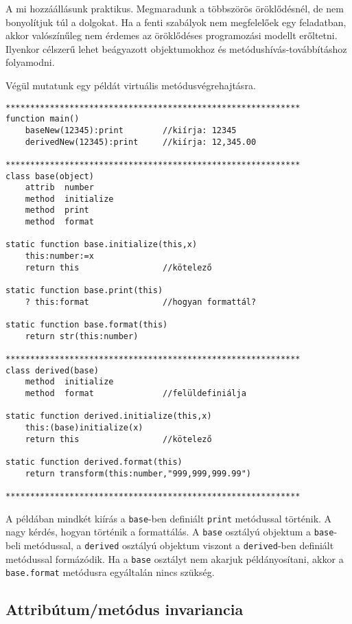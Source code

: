 A mi hozzáállásunk praktikus. Megmaradunk a többszörös öröklődésnél,
de nem bonyolítjuk túl a dolgokat. Ha a fenti szabályok nem megfelelőek
egy feladatban, akkor valószínűleg nem érdemes az öröklődéses
programozási modellt erőltetni. Ilyenkor célszerű lehet
beágyazott objektumokhoz és metódushívás-továbbításhoz folyamodni.

Végül mutatunk egy példát virtuális metódusvégrehajtásra.

\begin{verbatim}
************************************************************
function main()
    baseNew(12345):print        //kiírja: 12345
    derivedNew(12345):print     //kiírja: 12,345.00

************************************************************
class base(object)
    attrib  number
    method  initialize
    method  print
    method  format

static function base.initialize(this,x)
    this:number:=x
    return this                 //kötelező

static function base.print(this)
    ? this:format               //hogyan formattál?

static function base.format(this)
    return str(this:number)

************************************************************
class derived(base)
    method  initialize
    method  format              //felüldefiniálja

static function derived.initialize(this,x)
    this:(base)initialize(x)
    return this                 //kötelező

static function derived.format(this)
    return transform(this:number,"999,999,999.99")

************************************************************
\end{verbatim}
A példában mindkét kiírás a \verb!base!-ben definiált \verb!print!
metódussal történik. A nagy kérdés, hogyan történik a formattálás.
A \verb!base! osztályú objektum a \verb!base!-beli metódussal, 
a \verb!derived! osztályú objektum viszont a \verb!derived!-ben 
definiált metódussal formázódik. Ha a \verb!base! osztályt nem akarjuk
példányosítani, akkor a \verb!base.format! metódusra egyáltalán nincs szükség.





\subsection{Attribútum/metódus invariancia}

